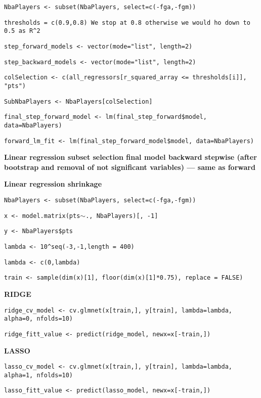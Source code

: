 \begin{center}
\texttt{NbaPlayers <- subset(NbaPlayers, select=c(-fga,-fgm))}

\texttt{thresholds = c(0.9,0.8) We stop at 0.8 otherwise we would ho down to 0.5 as R\^{}2}

\texttt{step\_forward\_models <- vector(mode="list", length=2)}

\texttt{step\_backward\_models <- vector(mode="list", length=2)}

\texttt{colSelection <- c(all\_regressors[r\_squared\_array <= thresholds[i]], "pts")}

\texttt{SubNbaPlayers <- NbaPlayers[colSelection]}



\texttt{final\_step\_forward\_model <- lm(final\_step\_forward\$model, data=NbaPlayers)}

\texttt{forward\_lm\_fit <- lm(final\_step\_forward\_model\$model, data=NbaPlayers)}
\end{center}
	
\noindent
\textbf{Linear regression subset selection final model backward stepwise (after bootstrap and removal of not significant variables) --- same as forward}

\noindent
\textbf{Linear regression shrinkage}

\begin{center}
\texttt{NbaPlayers <- subset(NbaPlayers, select=c(-fga,-fgm))}

\texttt{x <- model.matrix(pts$\sim$., NbaPlayers)[, -1]}

\texttt{y <- NbaPlayers\$pts}

\texttt{lambda <- 10\^{}seq(-3,-1,length = 400)}

\texttt{lambda <- c(0,lambda)}

\texttt{train <- sample(dim(x)[1], floor(dim(x)[1]*0.75), replace = FALSE)}
\end{center}
	
\textbf{RIDGE}

\begin{center}
\texttt{ridge\_cv\_model <- cv.glmnet(x[train,], y[train], lambda=lambda, alpha=0, nfolds=10)}


\texttt{ridge\_fitt\_value <- predict(ridge\_model, newx=x[-train,])}
\end{center}
	
\textbf{LASSO}

\begin{center}
\texttt{lasso\_cv\_model <- cv.glmnet(x[train,], y[train], lambda=lambda, alpha=1, nfolds=10)}


\texttt{lasso\_fitt\_value <- predict(lasso\_model, newx=x[-train,])}
\end{center}